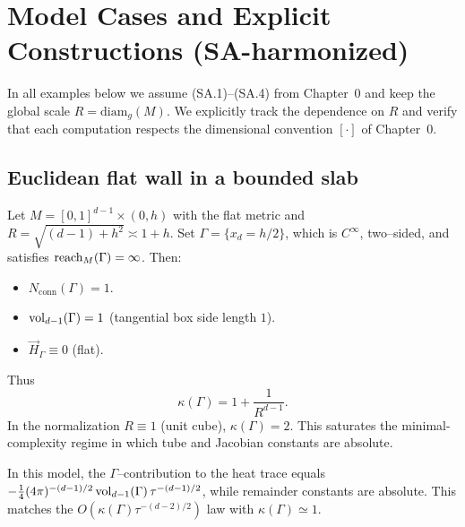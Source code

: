 \bigskip


\section{Model Cases and Explicit Constructions (SA-harmonized)}
\label{sec:examples-kappa}

In all examples below we assume (SA.1)–(SA.4) from Chapter~0 and keep the global scale $R=\mathrm{diam}_g(M)$.
We explicitly track the dependence on $R$ and verify that each computation respects the dimensional convention $[\cdot]$ of Chapter~0.

\subsection{Euclidean flat wall in a bounded slab}
\label{subsec:flat-wall}
Let $M=[0,1]^{d-1}\times(0,h)$ with the flat metric and $R=\sqrt{(d-1)+h^2}\asymp 1+h$.
Set $\Gamma=\{x_d=h/2\}$, which is $C^\infty$, two–sided, and satisfies $\operatorname{reach}_M(\Gamma)=\infty$.
Then:
\begin{itemize}
\item $N_{\mathrm{conn}}(\Gamma)=1$.
\item $\operatorname{vol}_{d-1}(\Gamma)=1$ (tangential box side length $1$).
\item $\vec H_\Gamma\equiv 0$ (flat).
\end{itemize}
Thus
\[
\kappa(\Gamma)=1+\frac{1}{R^{d-1}}.
\]
In the normalization $R\equiv 1$ (unit cube), $\kappa(\Gamma)=2$. This saturates the minimal-complexity regime in which tube and Jacobian constants are absolute.

\begin{remark}
In this model, the $\Gamma$–contribution to the heat trace equals
$-\frac14(4\pi)^{-(d-1)/2}\operatorname{vol}_{d-1}(\Gamma)\,\tau^{-(d-1)/2}$,
while remainder constants are absolute. This matches the $O(\kappa(\Gamma)\tau^{-(d-2)/2})$ law with $\kappa(\Gamma)\simeq 1$.
\end{remark}


